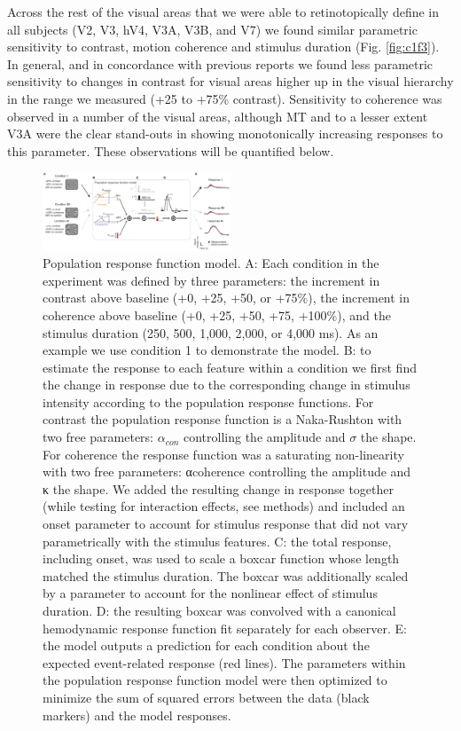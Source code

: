 \documentclass{report}
\begin{document}
Across the rest of the visual areas that we were able to retinotopically define in all subjects (V2, V3, hV4, V3A, V3B, and V7) we found similar parametric sensitivity to contrast, motion coherence and stimulus duration (Fig. \ref{fig:c1f3}). In general, and in concordance with previous reports \citep{Avidan2002-jg} we found less parametric sensitivity to changes in contrast for visual areas higher up in the visual hierarchy in the range we measured (+25 to +75\% contrast). Sensitivity to coherence was observed in a number of the visual areas, although MT and to a lesser extent V3A were the clear stand-outs in showing monotonically increasing responses to this parameter. These observations will be quantified below.

\begin{figure}
\centering
\includegraphics[keepaspectratio,width=0.5\textwidth]{figs_c1/Fig4_model.pdf}
\caption[Population response function model]{Population response function model. A: Each condition in the experiment was defined by three parameters: the increment in contrast above baseline (+0, +25, +50, or +75\%), the increment in coherence above baseline (+0, +25, +50, +75, +100\%), and the stimulus duration (250, 500, 1,000, 2,000, or 4,000 ms). As an example we use condition 1 to demonstrate the model. B: to estimate the response to each feature within a condition we first find the change in response due to the corresponding change in stimulus intensity according to the population response functions. For contrast the population response function is a Naka-Rushton with two free parameters: $\alpha_{con}$ controlling the amplitude and $\sigma$ the shape. For coherence the response function was a saturating non-linearity with two free parameters: αcoherence controlling the amplitude and κ the shape. We added the resulting change in response together (while testing for interaction effects, see methods) and included an onset parameter to account for stimulus response that did not vary parametrically with the stimulus features. C: the total response, including onset, was used to scale a boxcar function whose length matched the stimulus duration. The boxcar was additionally scaled by a parameter to account for the nonlinear effect of stimulus duration. D: the resulting boxcar was convolved with a canonical hemodynamic response function fit separately for each observer. E: the model outputs a prediction for each condition about the expected event-related response (red lines). The parameters within the population response function model were then optimized to minimize the sum of squared errors between the data (black markers) and the model responses.}
\label{fig:c1f4}
\end{figure}
\end{document}
